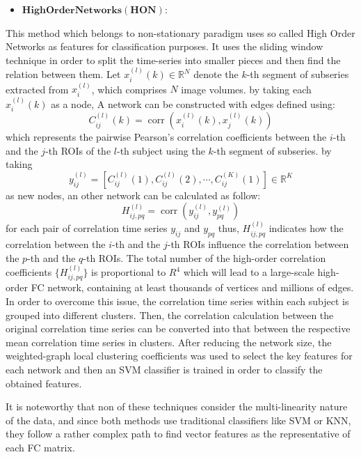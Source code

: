 \documentclass[preprint,12pt]{elsarticle}
\begin{document}
\begin{itemize}
	\item $\mathbf{High Order Networks(HON):}$
\end{itemize}
This method which belongs to non-stationary paradigm uses so called
High Order Networks as features for classification purposes. It uses the sliding window technique  in order to split the time-series into smaller pieces and then find the relation between them\cite{r51}\textendash \cite{r52}. Let $x_{i}^{(l)}(k) \in \mathbb{R}^N$ denote the $k$-th segment of subseries extracted from $x_{i}^{(l)}$, which comprises $N$ image volumes. by taking each $x_{i}^{(l)}(k)$ as a node, A network can be constructed with edges defined using:
\[
C_{ij}^{(l)}(k) = \operatorname{corr}\left(x_{i}^{(l)}(k),x_{j}^{(l)}(k)
\right)
\]
which represents the pairwise Pearson’s correlation coefficients
between the $i$-th and the $j$-th ROIs of the $l$-th subject using the $k$-th segment of subseries. 
by taking  
\[
y_{ij}^{(l)} = \left[ 
C_{ij}^{(l)}(1), C_{ij}^{(l)}(2), \cdots , C_{ij}^{(K)}(1) 
\right] \in \mathbb{R}^K
\]
as new nodes, an other network can be calculated as follow: 
\[
H_{ij,pq}^{(l)} = \operatorname{corr} \left(
y_{ij}^{(l)},y_{pq}^{(l)}
\right)
\]
for each pair of correlation time series $y_{ij}$ and $y_{pq}$ thus, $H_{ij,pq}^{(l)}$ indicates how the correlation between the $i$-th and the $j$-th ROIs influence the correlation between the $p$-th and the $q$-th ROIs.
The total number of the high-order correlation coefficients
$\{ H_{ij,pq}^{(l)} \}$ is proportional to $R^4$ which will lead to a large-scale high-order FC
network, containing at least thousands of vertices and millions
of edges. In order to overcome this issue, the correlation time series within each subject is grouped into different clusters. Then, the correlation calculation
between the original correlation time series can be
converted into that between the respective mean correlation
time series in clusters. After reducing the network size, the
weighted-graph local clustering coefficients was used to select the key features for each network and then an SVM classifier is trained in order to classify the obtained features.  

It is noteworthy that non of these techniques consider the multi-linearity nature of the data, and since both methods use traditional classifiers like SVM or KNN, they follow a rather complex path to find vector features as the representative of each FC matrix.
	
\end{document}
